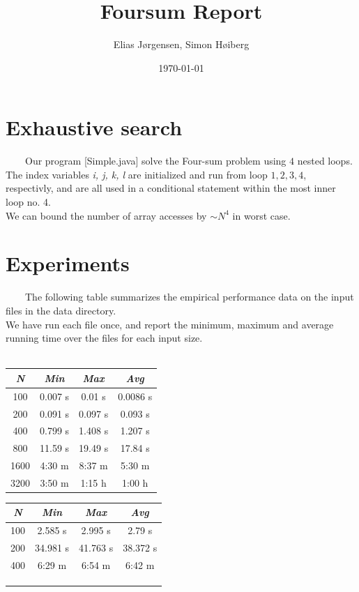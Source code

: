\documentclass[a4paper,11pt]{article}
\title{Foursum Report}
\author{Elias Jørgensen, Simon Høiberg}
\date{\today}
\begin{document}
\maketitle

\section*{Exhaustive search}

\ \ \ \
Our program [Simple.java] solve the Four-sum problem using $ 4 $ nested loops. \\
The index variables \textit{i, j, k, l} are initialized and run from loop $ 1, 2, 3, 4 $,
respectivly, and are all used in a conditional statement within the most inner loop no. 4. \\
We can bound the number of array accesses by $\sim N^4 $ in worst case.

\section*{Experiments}

\ \ \ \
The following table summarizes the empirical performance data on the input files in the data directory.\\
We have run each file once, and report the minimum, maximum and average running time over the files
for each input size. \\
\hspace{5mm}\\

{
\centering
\begin{tabular}{cccc}
\hline
\textit{N} & \textit{Min} & \textit{Max} & \textit{Avg} \\
\hline
100 & 0.007 s & 0.01 s & 0.0086 s \\
200 & 0.091 s & 0.097 s & 0.093 s \\
400 & 0.799 s & 1.408 s & 1.207 s \\
800 & 11.59 s & 19.49 s & 17.84 s \\
1600 & 4:30 m & 8:37 m & 5:30 m \\
3200 & 3:50 m & 1:15 h & 1:00 h \\
\hline
\end{tabular}
\quad
\begin{tabular}{cccc}
\hline
\textit{N} & \textit{Min} & \textit{Max} & \textit{Avg} \\
\hline
100 & 2.585 s & 2.995 s & 2.79 s \\
200 & 34.981 s & 41.763 s & 38.372 s \\
400 & 6:29 m & 6:54 m & 6:42 m \\
\hline
\\
\\
\\
\end{tabular}\\
}
\end{document}
